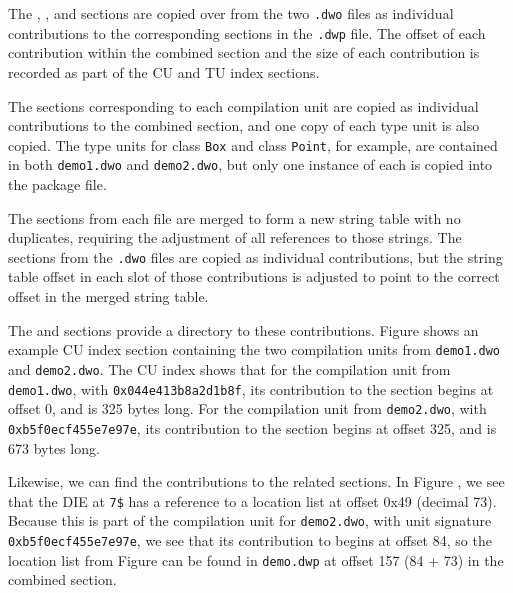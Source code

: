 The \dotdebugabbrevdwo{}, \dotdebugrnglistsdwo{}, 
\dotdebugloclistsdwo{} and \dotdebuglinedwo{}
sections are copied over from the two \texttt{.dwo} files as
individual contributions to the corresponding sections in the
\texttt{.dwp} file. 
The offset of each contribution within 
the combined section and the size of each contribution is recorded
as part of the CU and TU index sections.

The \dotdebuginfodwo{} sections corresponding to each compilation 
unit are copied as individual contributions to the combined
\dotdebuginfodwo{} section, and one copy of each type unit 
is also copied. The type units for class \texttt{Box} and class 
\texttt{Point}, for example, are contained in both \texttt{demo1.dwo} 
and \texttt{demo2.dwo}, but only one instance of each is copied into 
the package file.

The \dotdebugstrdwo{} sections from each file are merged to
form a new string table with no duplicates, requiring the
adjustment of all references to those strings. The
\dotdebugstroffsetsdwo{} sections from the \texttt{.dwo} files 
are copied as individual contributions, but the string table offset
in each slot of those contributions is adjusted to point to
the correct offset in the merged string table.

The \dotdebugcuindex{} and \dotdebugtuindex{} sections provide a
directory to these contributions. 
Figure  shows an example CU
index section containing the two compilation units from 
\texttt{demo1.dwo} and \texttt{demo2.dwo}. The CU index shows that 
for the compilation unit from \texttt{demo1.dwo}, with \CUsignature{} 
\texttt{0x044e413b8a2d1b8f}, its contribution to the \dotdebuginfodwo{} 
section begins at offset 0, and is 325 bytes long. For the compilation 
unit from \texttt{demo2.dwo}, with \CUsignature{} 
\texttt{0xb5f0ecf455e7e97e}, its contribution to the \dotdebuginfodwo{}
section begins at offset 325, and is 673 bytes long.

Likewise, we can find the contributions to the related sections.
In Figure , 
we see that the \DWTAGvariable{} DIE at \texttt{7\$} has a
reference to a location list at offset 0x49 (decimal 73). Because
this is part of the compilation unit for \texttt{demo2.dwo}, with 
unit signature \texttt{0xb5f0ecf455e7e97e}, we see that its contribution 
to \dotdebugloclistsdwo{} begins at offset 84, so the location list from
Figure  
can be found in \texttt{demo.dwp} at offset 157 (84 + 73) in
the combined \dotdebugloclistsdwo{} section.

